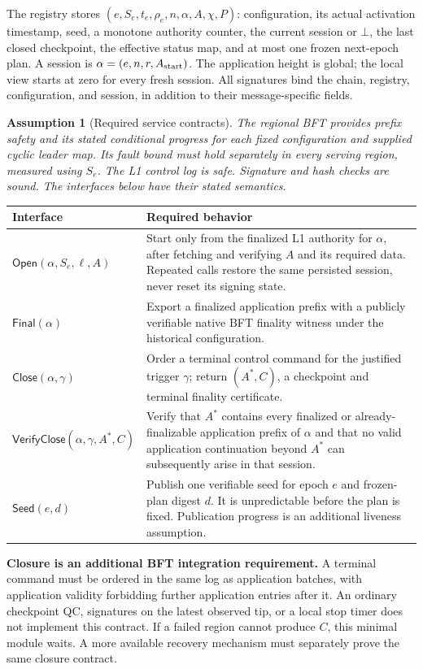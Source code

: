 \documentclass[11pt,a4paper]{article}
\newcommand{\Proc}[1]{\mathsf{#1}}
\newtheorem{assumption}{Assumption}
\begin{document}
The registry stores $(e,S_e,t_e,\rho_e,n,\alpha,A,\chi,P)$: configuration,
its actual activation timestamp, seed, a monotone authority counter,
the current session or $\bot$, the last closed checkpoint, the effective
status map, and at most one frozen next-epoch plan. A session is
$\alpha=(e,n,r,A_{\rm start})$. The application height is global;
the local view starts at zero for every fresh session. All signatures bind
the chain, registry, configuration, and session, in addition to their
message-specific fields.

\begin{assumption}[Required service contracts]
\label{ass:services}
The regional BFT provides prefix safety and its stated conditional progress
for each fixed configuration and supplied cyclic leader map. Its fault bound
must hold separately in every serving region, measured using $S_e$.
The L1 control log is safe. Signature and hash checks are sound.
The interfaces below have their stated semantics.
\end{assumption}

\begin{tabularx}{\linewidth}{@{}p{.26\linewidth}Y@{}}
\toprule
Interface & Required behavior\\\midrule
$\Proc{Open}(\alpha,S_e,\ell,A)$ &
Start only from the finalized L1 authority for $\alpha$, after fetching
and verifying $A$ and its required data. Repeated calls restore the same
persisted session, never reset its signing state.\\
$\Proc{Final}(\alpha)$ &
Export a finalized application prefix with a publicly verifiable native
BFT finality witness under the historical configuration.\\
$\Proc{Close}(\alpha,\gamma)$ &
Order a terminal control command for the justified trigger $\gamma$;
return $(A^*,C)$, a checkpoint and terminal finality certificate.\\
$\Proc{VerifyClose}(\alpha,\gamma,A^*,C)$ &
Verify that $A^*$ contains every finalized or already-finalizable application
prefix of $\alpha$ and that no valid application continuation beyond
$A^*$ can subsequently arise in that session.\\
$\Proc{Seed}(e,d)$ &
Publish one verifiable seed for epoch $e$ and frozen-plan digest $d$.
It is unpredictable before the plan is fixed. Publication progress is
an additional liveness assumption.\\
\bottomrule
\end{tabularx}

\textbf{Closure is an additional BFT integration requirement.}
A terminal command must be ordered in the same log as application batches,
with application validity forbidding further application entries after it.
An ordinary checkpoint QC, signatures on the latest observed tip, or a
local stop timer does not implement this contract. If a failed region
cannot produce $C$, this minimal module waits. A more available recovery
mechanism must separately prove the same closure contract.
\end{document}
